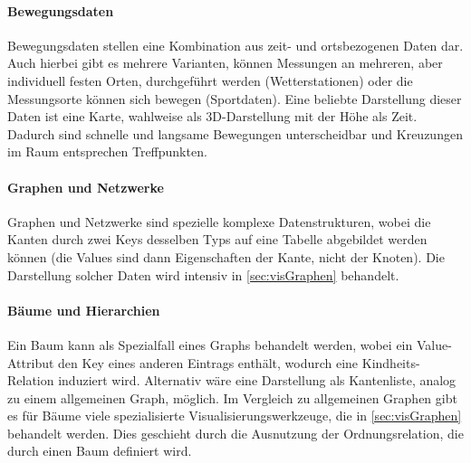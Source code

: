 			\paragraph{Bewegungsdaten}
				Bewegungsdaten stellen eine Kombination aus zeit- und ortsbezogenen Daten dar. Auch hierbei gibt es mehrere Varianten, \bspw können Messungen an mehreren, aber individuell festen Orten, durchgeführt werden (\zB Wetterstationen) oder die Messungsorte können sich bewegen (\zB Sportdaten). Eine beliebte Darstellung dieser Daten ist eine Karte, wahlweise als 3D-Darstellung mit der Höhe als Zeit. Dadurch sind schnelle und langsame Bewegungen unterscheidbar und Kreuzungen im Raum entsprechen Treffpunkten.

			\paragraph{Graphen und Netzwerke}
				Graphen und Netzwerke sind spezielle komplexe Datenstrukturen, wobei die Kanten durch zwei Keys desselben Typs auf eine Tabelle abgebildet werden können (die Values sind dann Eigenschaften der Kante, nicht der Knoten). Die Darstellung solcher Daten wird intensiv in \autoref{sec:visGraphen} behandelt.

			\paragraph{Bäume und Hierarchien}
				Ein Baum kann als Spezialfall eines Graphs behandelt werden, wobei ein Value-Attribut den Key eines anderen Eintrags enthält, wodurch eine Kindheits-Relation induziert wird. Alternativ wäre eine Darstellung als Kantenliste, analog zu einem allgemeinen Graph, möglich. Im Vergleich zu allgemeinen Graphen gibt es für Bäume viele spezialisierte Visualisierungswerkzeuge, die in \autoref{sec:visGraphen} behandelt werden. Dies geschieht durch die Ausnutzung der Ordnungsrelation, die durch einen Baum definiert wird.

